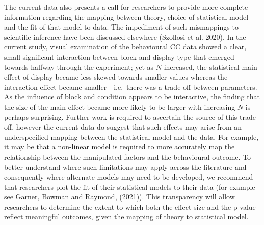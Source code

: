 \documentclass{article}
\begin{document}
The current data also presents a call for researchers to provide more complete information regarding the mapping between theory, choice of statistical model and the fit of that model to data. The impediment of such mismappings to scientific inference have been discussed elsewhere (Szollosi et al. 2020). In the current study, visual examination of the behavioural CC data showed a clear, small significant interaction between block and display type that emerged towards halfway through the experiment; yet as \(N\) increased, the statistical main effect of display became less skewed towards smaller values whereas the interaction effect became smaller - i.e.~there was a trade off between parameters. As the influence of block and condition appears to be interactive, the finding that the size of the main effect became more likely to be larger with increasing \(N\) is perhaps surprising. Further work is required to ascertain the source of this trade off, however the current data do suggest that such effects may arise from an underspecified mapping between the statistical model and the data. For example, it may be that a non-linear model is required to more accurately map the relationship between the manipulated factors and the behavioural outcome. To better understand where such limitations may apply across the literature and consequently where alternate models may need to be developed, we recommend that researchers plot the fit of their statistical models to their data (for example see Garner, Bowman and Raymond, (2021)). This transparency will allow researchers to determine the extent to which both the effect size and the p-value reflect meaningful outcomes, given the mapping of theory to statistical model.
\end{document}
